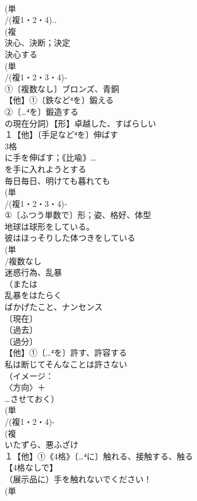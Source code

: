 \documentclass[8pt]{extreport}
\begin{document}
\begin{CJK}{UTF8}{min}
\\	(単
\\	/(複1・2・4)..
\\	(複
\\	決心、決断；決定 
\\	決心する
\\	(単
\\	/(複1・2・3・4)‐
\\	①〔複数なし〕ブロンズ、青銅
\\	【他】①〔鉄など⁴を〕鍛える 
\\	②〔…⁴を〕鍛造する 
\\	の現在分詞）【形】卓越した、すばらしい 
\\	１【他】〔手足など⁴を〕伸ばす 
\\	3格 
\\	に手を伸ばす；｟比喩｠…
\\	を手に入れようとする
\\	毎日毎日、明けても暮れても
\\	(単
\\	/(複1・2・3・4)‐
\\	①〔ふつう単数で〕形；姿、格好、体型 
\\	地球は球形をしている。　
\\	彼はほっそりした体つきをしている
\\	(単
\\	/複数なし 
\\	迷惑行為、乱暴　
\\	（または
\\	乱暴をはたらく 
\\	ばかげたこと、ナンセンス 
\\	〔現在〕
\\	〔過去〕
\\	〔過分〕
\\	【他】①〔…⁴を〕許す、許容する 
\\	私は断じてそんなことは許さない 
\\	（イメージ：
\\	〈方向〉＋
\\	…させておく）
\\	(単
\\	/(複1・2・4)-
\\	(複
\\	いたずら、悪ふざけ
\\	１【他】①《4格》〔…⁴に〕触れる、接触する、触る 
\\	【4格なしで】
\\	（展示品に）手を触れないでください！
\\	(単

\end{CJK}
\end{document}
